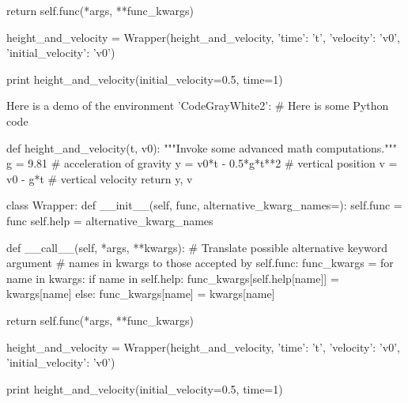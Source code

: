         return self.func(*args, **func_kwargs)

height_and_velocity = Wrapper(height_and_velocity,
                              {'time': 't',
                               'velocity': 'v0',
                               'initial_velocity': 'v0'})

print height_and_velocity(initial_velocity=0.5, time=1)


\noindent
Here is a demo of the environment 'CodeGrayWhite2':
# Here is some Python code

def height_and_velocity(t, v0):
    """Invoke some advanced math computations."""
    g = 9.81                  # acceleration of gravity
    y = v0*t - 0.5*g*t**2     # vertical position
    v = v0 - g*t              # vertical velocity
    return y, v

class Wrapper:
    def __init__(self, func, alternative_kwarg_names={}):
        self.func = func
        self.help = alternative_kwarg_names

    def __call__(self, *args, **kwargs):
        # Translate possible alternative keyword argument
        # names in kwargs to those accepted by self.func:
        func_kwargs = {}
        for name in kwargs:
            if name in self.help:
                func_kwargs[self.help[name]] = kwargs[name]
            else:
                func_kwargs[name] = kwargs[name]

        return self.func(*args, **func_kwargs)

height_and_velocity = Wrapper(height_and_velocity,
                              {'time': 't',
                               'velocity': 'v0',
                               'initial_velocity': 'v0'})

print height_and_velocity(initial_velocity=0.5, time=1)


